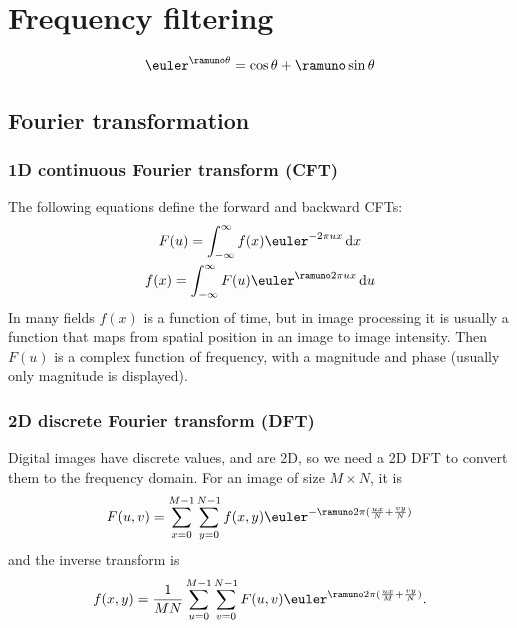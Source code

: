 \section{Frequency filtering}

\begin{equation}
    \euler^{\ramuno \theta}
    =
    \cos \theta
    +
    \ramuno \sin \theta
\end{equation}

\subsection{Fourier transformation}

\subsubsection{1D continuous Fourier transform (CFT)}
The following equations define the forward and backward CFTs:
\begin{gather}
    F(u) = \int_{-\infty}^{\infty} f(x) \euler^{-2 \pi u x} \dif x \\
    f(x) = \int_{-\infty}^{\infty} F(u) \euler^{\ramuno 2 \pi u x} \dif u \\
\end{gather}
In many fields $f(x)$ is a function of time, but in image processing it is usually a function that maps from spatial position in an image to image intensity. Then $F(u)$ is a complex function of frequency, with a magnitude and phase (usually only magnitude is displayed).

\subsubsection{2D discrete Fourier transform (DFT)}
Digital images have discrete values, and are 2D, so we need a 2D DFT to convert them to the frequency domain. For an image of size $M \times N$, it is
\begin{equation}
    F(u,v)
    =
    \sum_{x=0}^{M-1}
    \sum_{y=0}^{N-1}
    f(x,y)
    \euler^{-\ramuno 2 \pi (\frac{ux}{N}+\frac{vy}{N})}
\end{equation}
and the inverse transform is
\begin{equation}
    f(x,y)
    =
    \frac{1}{MN}
    \sum_{u=0}^{M-1}
    \sum_{v=0}^{N-1}
    F(u,v)
    \euler^{\ramuno 2 \pi (\frac{ux}{M}+\frac{vy}{N})}
    .
\end{equation}

